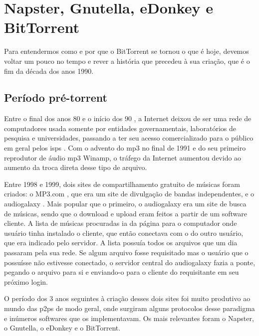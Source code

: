 
\chapter{Napster, Gnutella, eDonkey e BitTorrent}

Para entendermos como e por que o BitTorrent se tornou o que é hoje, devemos voltar um
pouco no tempo e rever a história que precedeu à sua criação, que é o fim da década dos
anos 1990.

\section{Período pré-torrent}

Entre o final dos anos 80 e o início dos 90 \cite{site:wiki-fs,site:wiki-fs-timeline}, a
Internet deixou de ser uma rede de computadores usada somente por entidades
governamentais, laboratórios de pesquisa e universidades, passando a ter seu acesso
comercializado para o público em geral pelos \glspl{isp} \cite{site:wiki-isp}. Com o
advento do \gls{mp3} \cite{site:wiki-mp3} no final de 1991 e do seu primeiro reprodutor
de áudio \gls*{mp3} Winamp, o tráfego da Internet aumentou devido ao aumento da troca
direta desse tipo de arquivo.

Entre 1998 e 1999, dois sites de compartilhamento gratuito de músicas foram criados: o
MP3.com \cite{site:wiki-mp3.com}, que era um site de divulgação de bandas independentes,
e o \gls{audiogalaxy} \cite{site:wiki-audiogalaxy.com,revista:pnp}. Mais popular que o
primeiro, o \gls*{audiogalaxy} era um site de busca de músicas, sendo que o download e
upload eram feitos a partir de um software cliente. A lista de músicas procuradas ia da
página para o computador onde usuário tinha instalado o cliente, que então conectava
com o do outro usuário, que era indicado pelo servidor. A lista possuía todos os
arquivos que um dia passaram pela sua rede. Se algum arquivo fosse requisitado mas o
usuário que o possuísse não estivesse conectado, o servidor central do
\gls*{audiogalaxy} fazia a ponte, pegando o arquivo para si e enviando-o para o cliente
do requisitante em seu próximo login.

O período dos 3 anos seguintes à criação desses dois sites foi muito produtivo ao
mundo das \glspl{p2p} de modo geral, onde surgiram alguns protocolos desse paradigma e
inúmeros softwares que os implementavam. Os mais relevantes foram o Napster, o Gnutella,
o eDonkey e o BitTorrent.

